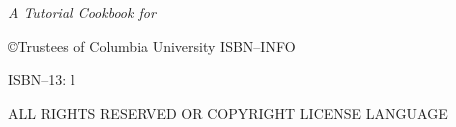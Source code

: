 \documentclass[10pt,twoside,openright]{memoir}
\begin{document}
\pagestyle{headings}
\let\cleardoublepage\clearpage
\maketitle
\frontmatter

\null\vfill

\begin{flushleft}
\textit{A Tutorial Cookbook for \TF}


\copyright{Trustees of Columbia University}
ISBN--INFO

ISBN--13: 
\bigskip
l




ALL RIGHTS RESERVED OR COPYRIGHT LICENSE LANGUAGE




\end{flushleft}
\let\cleardoublepage\clearpage

\newpage
\tableofcontents*
\mainmatter
\sloppy









\end{document}
